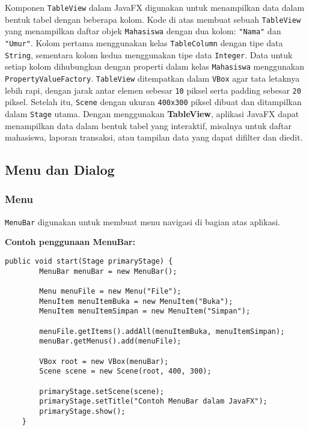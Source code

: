 Komponen \texttt{TableView} dalam JavaFX digunakan untuk menampilkan data dalam bentuk tabel dengan beberapa kolom. Kode di atas membuat sebuah \texttt{TableView} yang menampilkan daftar objek \texttt{Mahasiswa} dengan dua kolom: \texttt{"Nama"} dan \texttt{"Umur"}. Kolom pertama menggunakan kelas \texttt{TableColumn} dengan tipe data \texttt{String}, sementara kolom kedua menggunakan tipe data \texttt{Integer}. Data untuk setiap kolom dihubungkan dengan properti dalam kelas \texttt{Mahasiswa} menggunakan \texttt{PropertyValueFactory}. \texttt{TableView} ditempatkan dalam \texttt{VBox} agar tata letaknya lebih rapi, dengan jarak antar elemen sebesar \texttt{10} piksel serta padding sebesar \texttt{20} piksel. Setelah itu, \texttt{Scene} dengan ukuran \texttt{400x300} piksel dibuat dan ditampilkan dalam \texttt{Stage} utama. Dengan menggunakan \textbf{TableView}, aplikasi JavaFX dapat menampilkan data dalam bentuk tabel yang interaktif, misalnya untuk daftar mahasiswa, laporan transaksi, atau tampilan data yang dapat difilter dan diedit.


\subsection{Menu dan Dialog}

\subsubsection{Menu}

\texttt{MenuBar} digunakan untuk membuat menu navigasi di bagian atas aplikasi.

\textbf{Contoh penggunaan MenuBar:}
\begin{lstlisting}[style=JavaStyle, caption=Membuat MenuBar dalam JavaFX]
	public void start(Stage primaryStage) {
		MenuBar menuBar = new MenuBar();
		
		Menu menuFile = new Menu("File");
		MenuItem menuItemBuka = new MenuItem("Buka");
		MenuItem menuItemSimpan = new MenuItem("Simpan");
		
		menuFile.getItems().addAll(menuItemBuka, menuItemSimpan);
		menuBar.getMenus().add(menuFile);
		
		VBox root = new VBox(menuBar);
		Scene scene = new Scene(root, 400, 300);
		
		primaryStage.setScene(scene);
		primaryStage.setTitle("Contoh MenuBar dalam JavaFX");
		primaryStage.show();
	}
\end{lstlisting}

